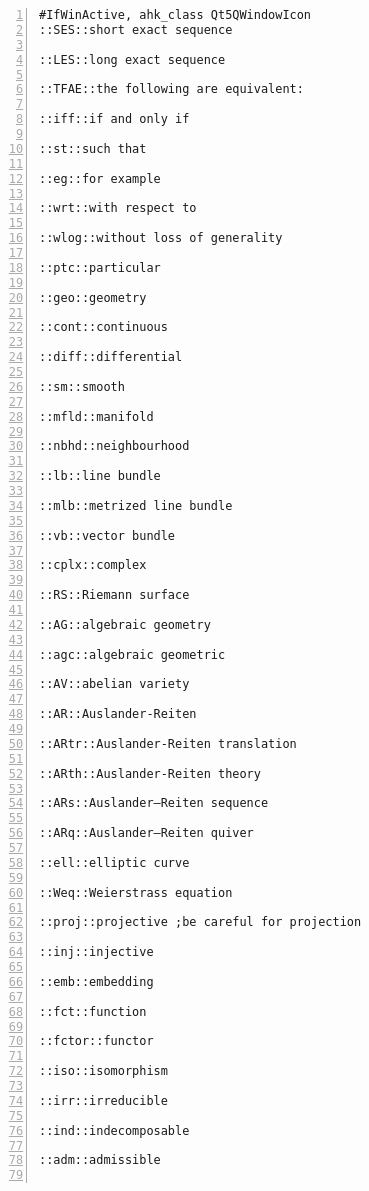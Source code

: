 \documentclass[11pt]{amsart}
\begin{document}
\begin{lstlisting}[numbers=left,numberstyle=\tiny,numbersep=10pt]
#IfWinActive, ahk_class Qt5QWindowIcon
::SES::short exact sequence

::LES::long exact sequence

::TFAE::the following are equivalent:

::iff::if and only if

::st::such that 

::eg::for example

::wrt::with respect to

::wlog::without loss of generality

::ptc::particular

::geo::geometry

::cont::continuous

::diff::differential

::sm::smooth

::mfld::manifold

::nbhd::neighbourhood

::lb::line bundle

::mlb::metrized line bundle

::vb::vector bundle

::cplx::complex

::RS::Riemann surface

::AG::algebraic geometry

::agc::algebraic geometric

::AV::abelian variety

::AR::Auslander-Reiten

::ARtr::Auslander-Reiten translation

::ARth::Auslander-Reiten theory

::ARs::Auslander–Reiten sequence

::ARq::Auslander–Reiten quiver

::ell::elliptic curve

::Weq::Weierstrass equation

::proj::projective ;be careful for projection

::inj::injective

::emb::embedding

::fct::function

::fctor::functor

::iso::isomorphism

::irr::irreducible

::ind::indecomposable

::adm::admissible


\end{lstlisting}
\end{document}
